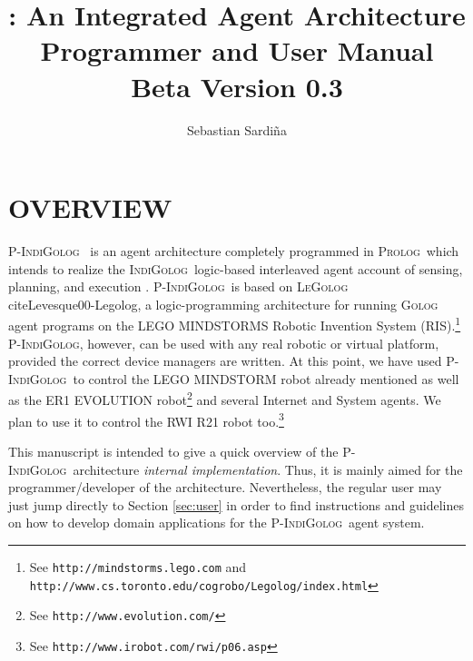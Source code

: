 \documentclass[11pt]{article}
\title{
\vfill 
{\huge \PIndiGolog: An Integrated Agent Architecture} \\
\vfill
{\Large Programmer and User Manual \\
Beta Version 0.3} \\
\vfill
}
\author{Sebastian Sardi\~na}
\newcommand{\LeGolog}{\mbox{\textsc{LeGolog}}}
\newcommand{\PIndiGolog}{\mbox{\textsc{P-IndiGolog}}}
\newcommand{\IndiGolog}{\mbox{\textsc{IndiGolog}}}
\newcommand{\Golog}{\mbox{\textsc{Golog}}}
\newcommand{\Prolog}{\mbox{\textsc{Prolog}}}
\begin{document}
\maketitle                %
\pagebreak
\tableofcontents        %
\pagebreak

\section{OVERVIEW}

\PIndiGolog\ \cite{Levesque00-Legolog} is an agent architecture completely
programmed in \Prolog\ which intends to realize the \IndiGolog\ logic-based
interleaved agent account of sensing, planning, and
execution \cite{Giuseppe99-IncremInt,Sardina00MSc,Lesperance00,
Giuseppe01,Giuseppe02, SardinaPhd05}. 
%
\PIndiGolog\ is based on \LeGolog\\cite{Levesque00-Legolog}, a logic-programming
architecture for running \Golog\ \cite{Levesque97-Golog} agent programs on the
LEGO MINDSTORMS Robotic Invention System (RIS).\footnote{See
\texttt{http://mindstorms.lego.com} and
\texttt{http://www.cs.toronto.edu/cogrobo/Legolog/index.html}}
%
\PIndiGolog, however, can be used with any real robotic or virtual platform,
provided the correct device managers are written. At this point, we have used
\PIndiGolog\ to control the LEGO MINDSTORM robot already mentioned as well as
the ER1 EVOLUTION robot\footnote{See \texttt{http://www.evolution.com/}} and
several Internet and System agents. We plan to use it to control the RWI R21
robot too.\footnote{See
  \texttt{http://www.irobot.com/rwi/p06.asp}}

This manuscript is intended to give a quick overview of the \PIndiGolog\
architecture \textit{internal implementation}. Thus, it is mainly aimed for the
programmer/developer of the architecture. Nevertheless, the regular user may
just jump directly to Section \ref{sec:user} in order to find instructions and
guidelines on how to develop domain applications for the \PIndiGolog\ agent
system. 
\end{document}
